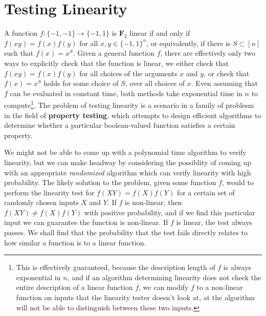 \section{Testing Linearity}

A function $f: \{ -1, -1 \} \to \{ -1, 1 \}$ is $\mathbf{F}_2$ linear if and only if $f(xy) = f(x) f(y)$ for all $x,y \in \{ -1, 1 \}^n$, or equivalently, if there is $S \subset [n]$ such that $f(x) = x^S$. Given a general function $f$, there are effectively only two ways to explicitly check that the function is linear, we either check that $f(xy) = f(x) f(y)$ for all choices of the arguments $x$ and $y$, or check that $f(x) = x^S$ holds for some choice of $S$, over all choices of $x$. Even assuming that $f$ can be evaluated in constant time, both methods take exponential time in $n$ to compute\footnote{This is effectively guaranteed, because the description length of $f$ is always exponential in $n$, and if an algorithm determining linearity does not check the entire description of a linear function $f$, we can modify $f$ to a non-linear function on inputs that the linearity tester doesn't look at, at the algorithm will not be able to distinguish between these two inputs.}. The problem of testing linearity is a scenario in a family of problesm in the field of {\bf property testing}, which attempts to design efficient algorithms to determine whether a particular boolean-valued function satisfies a certain property.

We might not be able to come up with a polynomial time algorithm to verify linearity, but we can make headway by considering the possiblity of coming up with an appropriate {\it randomized} algorithm which can verify linearity with high probability. The likely solution to the problem, given some function $f$, would to perform the linearity test for $f(XY) = f(X) f(Y)$ for a certain set of randomly chosen inputs $X$ and $Y$. If $f$ is non-linear, then $f(XY) \neq f(X) f(Y)$ with positive probability, and if we find this particular input we can guarantee the function is non-linear. If $f$ is linear, the test always passes. We shall find that the probability that the test fails directly relates to how similar a function is to a linear function.

